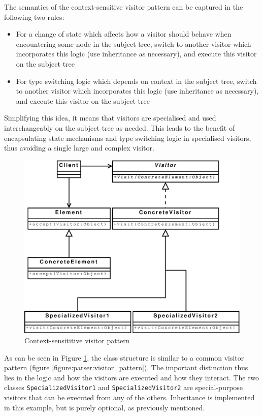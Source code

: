 The semantics of the context-sensitive visitor pattern can be captured in the
following two rules:
\begin{itemize}
  \item For a change of state which affects how a visitor should behave when
  encountering some node in the subject tree, switch to another visitor which
  incorporates this logic (use inheritance as necessary), and execute this
  visitor on the subject tree
  \item For type switching logic which depends on context in the subject tree,
  switch to another visitor which incorporates this logic (use inheritance as
  necessary), and execute this visitor on the subject tree
\end{itemize}

Simplifying this idea, it means that visitors are specialised and used
interchangeably on the subject tree as needed. This leads to the benefit of
encapsulating state mechanisms and type switching logic in specialised
visitors, thus avoiding a single large and complex visitor.

\begin{figure}[h]
  \centering
    \includegraphics[scale=0.40]{diagrams/context_visitor_pattern} 
  \caption{Context-sensititive visitor pattern}
  \label{figure:parser:context_visitor_pattern}
\end{figure}

As can be seen in Figure \ref{figure:parser:context_visitor_pattern}, the
class structure is similar to a common visitor pattern (figure
\ref{figure:parser:visitor_pattern}). The important distinction thus lies in
the logic and how the visitors are executed and how they interact. The two
classes \verb!SpecializedVisitor1! and \verb!SpecializedVisitor2! are
special-purpose visitors that can be executed from any of the others.
Inheritance is implemented in this example, but is purely optional, as
previously mentioned.